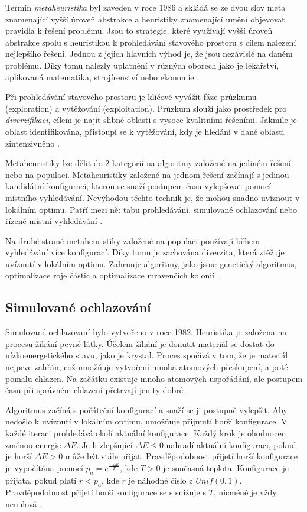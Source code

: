 Termín \textit{metaheuristika} byl zaveden v roce 1986 a skládá se ze dvou slov meta znamenající vyšší úroveň abstrakce a heuristiky znamenající umění objevovat pravidla k řešení problému.
Jsou to strategie, které využívají vyšší úroveň abstrakce spolu s heuristikou k prohledávání stavového prostoru s cílem nalezení nejlepšího řešení.
Jednou z jejich hlavních výhod je, že jsou nezávislé na daném problému.
Díky tomu nalezly uplatnění v různých oborech jako je lékařství, aplikovaná matematika, strojírenství nebo ekonomie \cite{kaveh, peres}.

Při prohledávání stavového prostoru je klíčové vyvážit fáze průzkumu (exploration) a vytěžování (exploitation).
Průzkum slouží jako prostředek pro \textit{diverzifikaci}, cílem je najít slibné oblasti s vysoce kvalitními řešeními.
Jakmile je oblast identifikována, přistoupí se k vytěžování, kdy je hledání v dané oblasti zintenzivněno \cite{peres}.

Metaheuristiky lze dělit do 2 kategorií na algoritmy založené na jediném řešení nebo na populaci.
Metaheuristiky založené na jednom řešení začínají s jedinou kandidátní konfigurací, kterou se snaží postupem času vylepšovat pomocí místního vyhledávání.
Nevýhodou těchto technik je, že mohou snadno uvíznout v lokálním optimu.
Patří mezi ně: tabu prohledávání, simulované ochlazování nebo řízené místní vyhledávání \cite{katoch}.

Na druhé straně metaheuristiky založené na populaci používají během vyhledávání více konfigurací.
Díky tomu je zachována diverzita, která ztěžuje uvíznutí v lokálním optimu.
Zahrnuje algoritmy, jako jsou: genetický algoritmus, optimalizace roje částic a optimalizace mravenčích kolonií \cite{katoch}.

\subsection{Simulované ochlazování}
Simulované ochlazovaní bylo vytvořeno v roce 1982.
Heuristika je založena na procesu žíhání pevné látky.
Účelem žíhání je donutit materiál se dostat do nízkoenergetického stavu, jako je krystal.
Proces spočívá v tom, že je materiál nejprve zahřán, což umožňuje vytvoření mnoha atomových přeskupení, a poté pomalu chlazen.
Na začátku existuje mnoho atomových uspořádání, ale postupem času při správném chlazení přetrvají jen ty dobré \cite{rutenbar}.

Algoritmus začíná s počáteční konfigurací a snaží se ji postupně vylepšit.
Aby nedošlo k uvíznutí v lokálním optimu, umožňuje přijmutí horší konfigurace.
V každé iteraci prohledává okolí aktuální konfigurace.
Každý krok je ohodnocen změnou energie $\Delta E$.
Je-li zlepšující $\Delta E\leq0$ nahradí aktuální konfiguraci, pokud je horší $\Delta E>0$ může být stále přijat.
Pravděpodobnost přijetí horší konfigurace je  vypočítána pomocí $p_a = e^{\frac{-\Delta E}{T}}$, kde $T>0$ je současná teplota.
Konfigurace je přijata, pokud platí $r<p_a$, kde $r$ je náhodné číslo z $ Unif(0, 1)$.
Pravděpodobnost přijetí horší konfigurace se s snižuje s $T$, nicméně je vždy nenulová \cite{rutenbar, kirkpatrik}.

